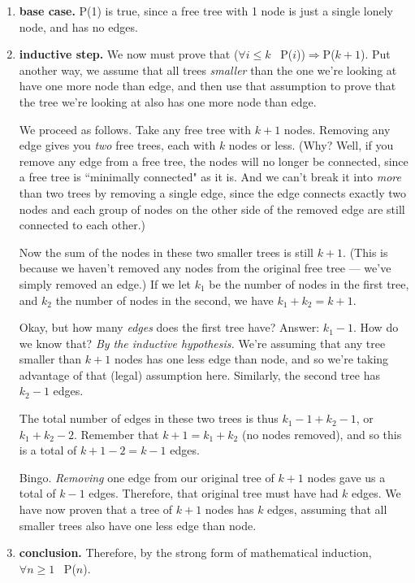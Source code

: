 \begin{enumerate} 

\item \textbf{base case.} P(1) is true, since a free tree with 1 node is
just a single lonely node, and has no edges.

\item \textbf{inductive step.}
We now must prove that ($\forall i \leq k$ \ P($i$))$\Rightarrow$P($k+1$).
Put another way, we assume that all trees \textit{smaller} than the one
we're looking at have one more node than edge, and then use that
assumption to prove that the tree we're looking at also has one more node
than edge. 

We proceed as follows. Take any free tree with $k+1$ nodes. Removing any
edge gives you \textit{two} free trees, each with $k$ nodes or less. (Why?
Well, if you remove any edge from a free tree, the nodes will no longer be
connected, since a free tree is ``minimally connected" as it is. And we
can't break it into \textit{more} than two trees by removing a single edge,
since the edge connects exactly two nodes and each group of nodes on the
other side of the removed edge are still connected to each other.)

Now the sum of the nodes in these two smaller trees is still $k+1$. (This
is because we haven't removed any nodes from the original free tree ---
we've simply removed an edge.) If we let $k_1$ be the number of nodes in
the first tree, and $k_2$ the number of nodes in the second, we have $k_1 +
k_2 = k + 1$.

Okay, but how many \textit{edges} does the first tree have? Answer: $k_1 -
1$. How do we know that? \textit{By the inductive hypothesis.} We're
assuming that any tree smaller than $k+1$ nodes has one less edge than
node, and so we're taking advantage of that (legal) assumption here.
Similarly, the second tree has $k_2 - 1$ edges.

The total number of edges in these two trees is thus $k_1 - 1 + k_2 - 1$,
or $k_1 + k_2 - 2$. Remember that $k+1 = k_1 + k_2$ (no nodes removed), and
so this is a total of $k+1-2 = k-1$ edges.

Bingo. \textit{Removing} one edge from our original tree of $k+1$ nodes
gave us a total of $k-1$ edges. Therefore, that original tree must have had
$k$ edges. We have now proven that a tree of $k+1$ nodes has $k$ edges,
assuming that all smaller trees also have one less edge than node.

\item \textbf{conclusion.} Therefore, by the strong form of mathematical induction, $\forall n \geq 1$
\ P($n$).

\end{enumerate}
